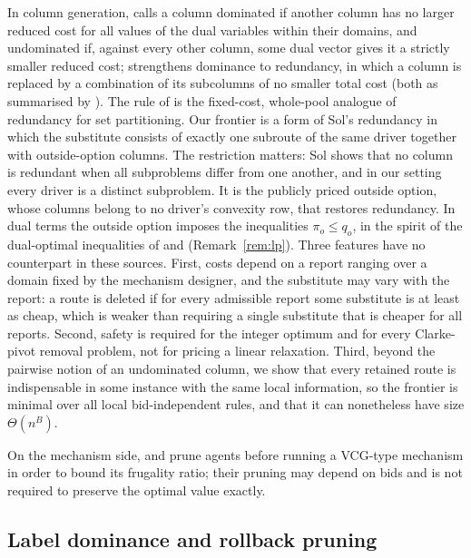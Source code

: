 \documentclass[review,12pt]{elsarticle}
\theoremstyle{definition}
\theoremstyle{remark}
\begin{document}
In column generation, \citet{vanderbeck1994thesis} calls a column dominated
if another column has no larger reduced cost for all values of the dual
variables within their domains, and undominated if, against every other
column, some dual vector gives it a strictly smaller reduced cost;
\citet{sol1994column} strengthens dominance to redundancy, in which a column
is replaced by a combination of its subcolumns of no smaller total cost
(both as summarised by \citealp[§5.1]{lubbecke2005selected}). The rule of
\citet{muller1998solving} is the fixed-cost, whole-pool analogue of
redundancy for set partitioning. Our frontier is a form of Sol's redundancy
in which the substitute consists of exactly one subroute of the same driver
together with outside-option columns. The restriction matters: Sol shows
that no column is redundant when all subproblems differ from one another,
and in our setting every driver is a distinct subproblem. It is the publicly
priced outside option, whose columns belong to no driver's convexity row,
that restores redundancy. In dual terms the outside option imposes the
inequalities $\pi_o\le q_o$, in the spirit of the dual-optimal inequalities
of \citet{valerio2005extra} and \citet{benamor2006dual}
(Remark~\ref{rem:lp}). Three features have no counterpart in these sources.
First, costs depend on a report ranging over a domain fixed by the mechanism
designer, and the substitute may vary with the report: a route is deleted if
for every admissible report some substitute is at least as cheap, which is
weaker than requiring a single substitute that is cheaper for all reports.
Second, safety is required for the integer optimum and for every
Clarke-pivot removal problem, not for pricing a linear relaxation. Third,
beyond the pairwise notion of an undominated column, we show that every
retained route is indispensable in some instance with the same local
information, so the frontier is minimal over all local bid-independent
rules, and that it can nonetheless have size $\Theta(n^B)$.

On the mechanism side, \citet{aggarwal2006knapsack} and
\citet{kempe2010frugal} prune agents before running a VCG-type mechanism in
order to bound its frugality ratio; their pruning may depend on bids and is
not required to preserve the optimal value exactly.

\subsection{Label dominance and rollback pruning}
\end{document}
